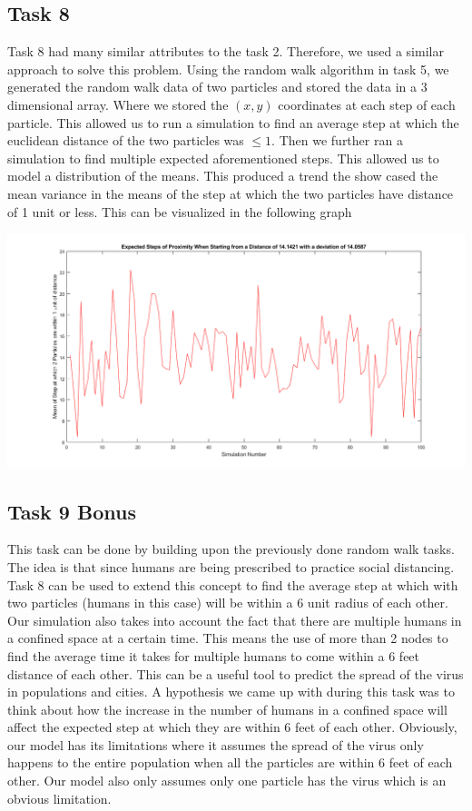 \documentclass{article}
\begin{document}
\subsection{Task 8}
Task 8 had many similar attributes to the task 2. Therefore, we used a similar approach to solve this problem. Using the random walk algorithm in task 5, we generated the random walk data
of two particles and stored the data in a 3 dimensional array. Where we stored the $(x,y)$ coordinates at each step of each particle. This allowed us to run a simulation to find an average 
step at which the euclidean distance of the two particles was $\leq 1$. Then we further ran a simulation to find multiple expected aforementioned steps. This allowed us to model a distribution 
of the means. This produced a trend the show cased the mean variance in the means of the step at which the two particles have distance of 1 unit or less. This can be visualized in the following 
graph

\begin{center}
    \includegraphics[scale = 0.4]{Meandist.png}
\end{center}

\subsection{Task 9 Bonus}
This task can be done by building upon the previously done random walk tasks. The idea is that since humans are being prescribed to practice social distancing. Task 8 can be used to extend this concept to find the average step at which with two particles (humans in this case) will be within a 6 unit radius of each other. Our simulation also takes into account the fact that there are
multiple humans in a confined space at a certain time. This means the use of more than 2 nodes to find the average time it takes for multiple humans to come within  a 6 feet distance of each other. This can be a useful tool to predict the spread of the virus in populations and cities. 
A hypothesis we came up with during this task was to think about how the increase in the number of humans in a confined space will affect the expected step at which they are within 6 feet of each other. Obviously, our
model has its limitations where it assumes the spread of the virus only happens to the entire population when all the particles are within 6 feet of each other. Our model also only assumes only one particle has the virus which is an obvious limitation.
\end{document}
